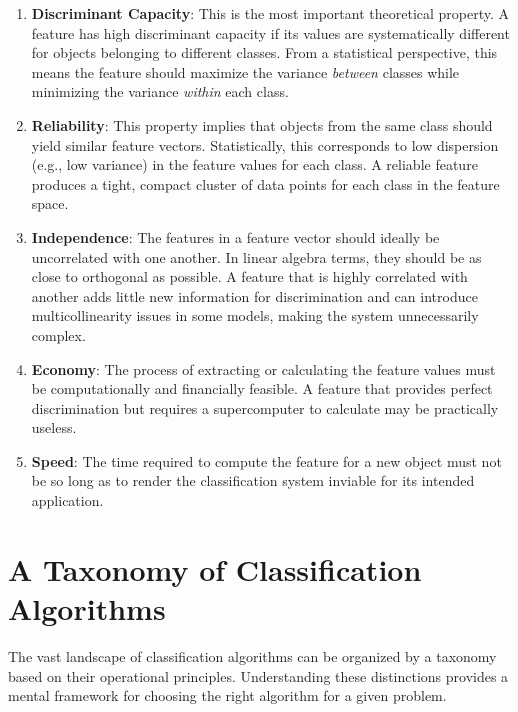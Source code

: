 \begin{enumerate}
    \item \textbf{Discriminant Capacity}: This is the most important theoretical property. A feature has high discriminant capacity if its values are systematically different for objects belonging to different classes. From a statistical perspective, this means the feature should maximize the variance \textit{between} classes while minimizing the variance \textit{within} each class.
    
    \item \textbf{Reliability}: This property implies that objects from the same class should yield similar feature vectors. Statistically, this corresponds to low dispersion (e.g., low variance) in the feature values for each class. A reliable feature produces a tight, compact cluster of data points for each class in the feature space.
    
    \item \textbf{Independence}: The features in a feature vector should ideally be uncorrelated with one another. In linear algebra terms, they should be as close to orthogonal as possible. A feature that is highly correlated with another adds little new information for discrimination and can introduce multicollinearity issues in some models, making the system unnecessarily complex.
    
    \item \textbf{Economy}: The process of extracting or calculating the feature values must be computationally and financially feasible. A feature that provides perfect discrimination but requires a supercomputer to calculate may be practically useless.
    
    \item \textbf{Speed}: The time required to compute the feature for a new object must not be so long as to render the classification system inviable for its intended application.
\end{enumerate}

\section{A Taxonomy of Classification Algorithms}
\label{sec:classifier_taxonomy}
The vast landscape of classification algorithms can be organized by a taxonomy based on their operational principles. Understanding these distinctions provides a mental framework for choosing the right algorithm for a given problem.

